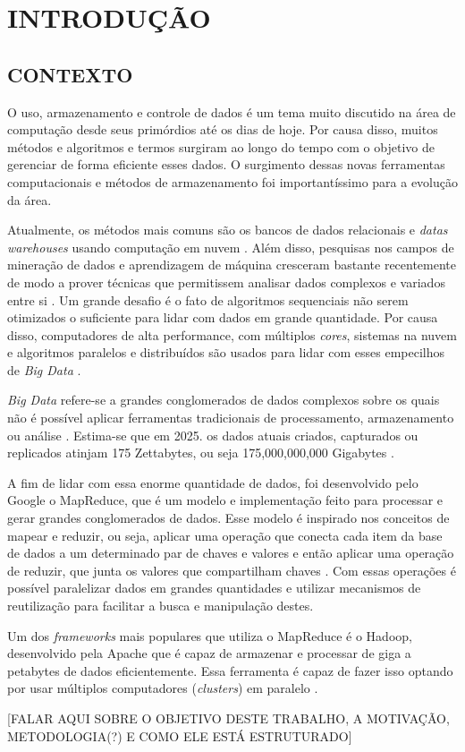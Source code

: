 \chapter{INTRODUÇÃO} \label{cha:introducao}

\section{CONTEXTO} \label{sec:contexto}

O uso, armazenamento e controle de dados é um tema muito discutido na área de computação desde seus primórdios até os dias de hoje. Por causa disso, muitos métodos e algoritmos e termos surgiram ao longo do tempo com o objetivo de gerenciar de forma eficiente esses dados. O surgimento dessas novas ferramentas computacionais e métodos de armazenamento foi importantíssimo para a evolução da área. 

Atualmente, os métodos mais comuns são os bancos de dados relacionais e \textit{datas warehouses} usando computação em nuvem \cite{PastAndFutureTrendsData19}. Além disso, pesquisas nos campos de mineração de dados e aprendizagem de máquina cresceram bastante recentemente de modo a prover técnicas que permitissem analisar dados complexos e variados entre si \cite{ProgrammingBigData22}. Um grande desafio é o fato de algoritmos sequenciais não serem otimizados o suficiente para lidar com dados em grande quantidade. Por causa disso, computadores de alta performance, com múltiplos \textit{cores}, sistemas na nuvem e algoritmos paralelos e distribuídos são usados para lidar com esses empecilhos de \textit{Big Data} \cite{ProgrammingBigData22}.

\textit{Big Data} refere-se a grandes conglomerados de dados complexos sobre os quais não é possível aplicar ferramentas tradicionais de processamento, armazenamento ou análise \cite{OptmizationSoftwareHadoop18}. Estima-se que em 2025. os dados atuais criados, capturados ou replicados atinjam 175 Zettabytes, ou seja 175,000,000,000 Gigabytes \cite{DigitalizationWorld18}.

A fim de lidar com essa enorme quantidade de dados, foi desenvolvido pelo Google o MapReduce, que é um modelo e implementação feito para processar e gerar grandes conglomerados de dados. Esse modelo é inspirado nos conceitos de mapear e reduzir, ou seja, aplicar uma operação que conecta cada item da base de dados a um determinado par de chaves e valores e então aplicar uma operação de reduzir, que junta os valores que compartilham chaves \cite{MapReduce04}. Com essas operações é possível paralelizar dados em grandes quantidades e utilizar mecanismos de reutilização para facilitar a busca e manipulação destes.

Um dos \textit{frameworks} mais populares que utiliza o MapReduce é o Hadoop, desenvolvido pela Apache que é capaz de armazenar e processar de giga a petabytes de dados eficientemente. Essa ferramenta é capaz de fazer isso optando por usar múltiplos computadores (\textit{clusters}) em paralelo \cite{HadoopBook15}.

[FALAR AQUI SOBRE O OBJETIVO DESTE TRABALHO, A MOTIVAÇÃO, METODOLOGIA(?) E COMO ELE ESTÁ ESTRUTURADO]